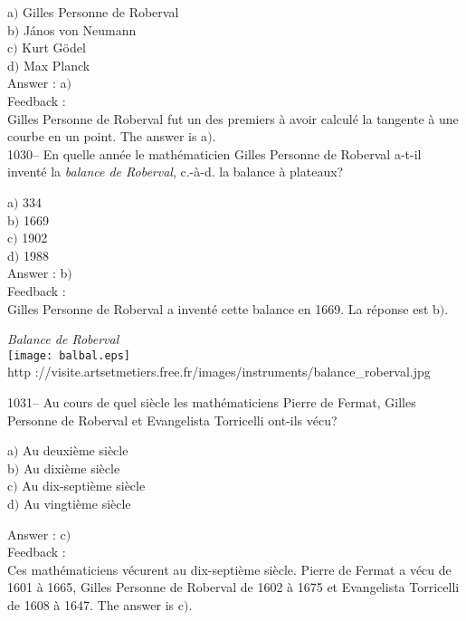 ﻿\documentclass[letterpaper, 12pt]{article}
\begin{document}
a$)$ Gilles Personne de Roberval  \\
b$)$ J\'anos von Neumann  \\
c$)$ Kurt G\"odel \\
d$)$ Max Planck\\

Answer : a$)$\\

Feedback :\\
Gilles Personne de Roberval fut un des premiers \`a avoir calcul\'e
la tangente \`a une courbe en un point.
The answer is a$)$.\\

1030-- En quelle ann\'ee le math\'ematicien Gilles Personne de
Roberval a-t-il invent\'e la {\sl balance de Roberval}, c.-\`a-d. la
balance \`a plateaux?

a$)$ 334  \\
b$)$ 1669 \\
c$)$ 1902  \\
d$)$ 1988 \\

Answer : b$)$\\

Feedback :\\
Gilles Personne de Roberval a invent\'e cette balance en 1669. La r\'eponse
est b$)$.\\

        \begin{center}
        {\sl Balance de Roberval}\\
    \texttt{[image: balbal.eps]}\\
        {\footnotesize http
://visite.artsetmetiers.free.fr/images/instruments/balance\_roberval.jpg}
    \end{center}

1031-- Au cours de quel si\`ecle les math\'ematiciens Pierre de
Fermat, Gilles Personne de Roberval et Evangelista Torricelli
ont-ils v\'ecu?

a$)$ Au deuxi\`eme si\`ecle \\
b$)$ Au dixi\`eme si\`ecle \\
c$)$ Au dix-septi\`eme si\`ecle \\
d$)$ Au vingti\`eme si\`ecle

Answer : c$)$\\

Feedback : \\
Ces math\'ematiciens v\'ecurent au dix-septi\`eme si\`ecle. Pierre
de Fermat a v\'ecu de 1601 \`a 1665,
Gilles Personne de Roberval de 1602 \`a 1675 et Evangelista Torricelli de
1608 \`a 1647. The answer is c$)$.\\
\end{document}
